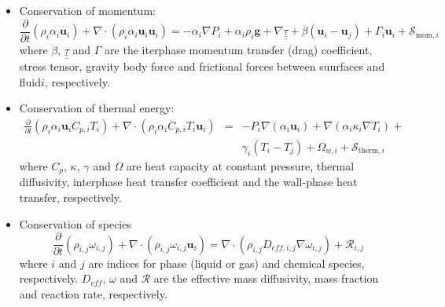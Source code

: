 \documentclass[calculator,datasheet]{exam}
\newcommand{\frc}{\displaystyle\frac}
\begin{document}
\begin{question}
\begin{itemize}
\item Conservation of momentum:
\begin{displaymath}
\frc{\partial}{\partial t}\left(\rho_{i}\alpha_{i}\mathbf{u}_{i}\right) + \nabla\cdot\left(\rho_{i}\alpha_{i}\mathbf{u}_{i}\mathbf{u}_{i}\right) = -\alpha_{i}\nabla P_{i} + \alpha_{i}\rho_{i}\mathbf{g} + \nabla\underline{\underline{\tau}} +\beta\left(\mathbf{u}_{i}-\mathbf{u}_{j}\right) + \Gamma_{i}\mathbf{u}_{i} + \mathcal{S}_{\text{mom},i}
\end{displaymath}
where $\beta$, $\underline{\underline{\tau}}$ and $\Gamma$ are the iterphase momentum transfer (drag) coefficient, stress tensor, gravity body force and frictional forces between suurfaces and fluid$i$, respectively. 

\item Conservation of thermal energy:
\begin{eqnarray}
\frc{\partial}{\partial t}\left(\rho_{i}\alpha_{i}\mathbf{u}_{i}C_{p,i}T_{i}\right) + \nabla\cdot\left(\rho_{i}\alpha_{i}C_{p,i}T_{i}\mathbf{u}_{i}\right) &=& -P_{i}\nabla\left(\alpha_{i}\mathbf{u}_{i}\right) + \nabla\left(\alpha_{i}\kappa_{i}\nabla T_{i}\right) + \nonumber \\
&& \gamma_{i}\left(T_{i}-T_{j}\right) + \Omega_{w,i} + \mathcal{S}_{\text{therm},i} \nonumber
\end{eqnarray}
where $C_{p}$, $\kappa$, $\gamma$ and $\Omega$ are heat capacity at constant pressure, thermal diffusivity, interphase heat transfer coefficient and the wall-phase heat transfer, respectively.

\item Conservation of species
\begin{displaymath}
\frc{\partial}{\partial t}\left(\rho_{i,j}\omega_{i,j}\right) + \nabla\cdot\left(\rho_{i,j}\omega_{i,j} \mathbf{u}_{i}\right) = \nabla\cdot\left(\rho_{i,j}D_{eff,i,j}\nabla\omega_{i,j}\right) + \mathcal{R}_{i,j}
\end{displaymath}
where $i$ and $j$ are indices for phase (liquid or gas) and chemical species, respectively. $D_{eff}$, $\omega$ and $\mathcal{R}$ are the effective mass diffusivity, mass fraction and reaction rate, respectively.

\end{itemize}

\end{question}


\vfill


\paperend
\end{document}
